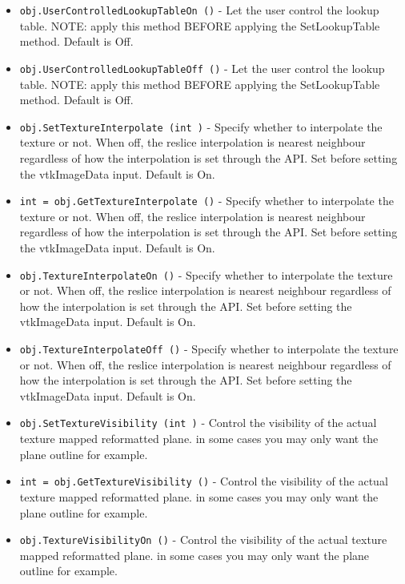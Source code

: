 \begin{itemize}
\item  \verb|obj.UserControlledLookupTableOn ()| -  Let the user control the lookup table. NOTE: apply this method BEFORE
 applying the SetLookupTable method.
 Default is Off.

\item  \verb|obj.UserControlledLookupTableOff ()| -  Let the user control the lookup table. NOTE: apply this method BEFORE
 applying the SetLookupTable method.
 Default is Off.

\item  \verb|obj.SetTextureInterpolate (int )| -  Specify whether to interpolate the texture or not. When off, the
 reslice interpolation is nearest neighbour regardless of how the
 interpolation is set through the API. Set before setting the
 vtkImageData input. Default is On.

\item  \verb|int = obj.GetTextureInterpolate ()| -  Specify whether to interpolate the texture or not. When off, the
 reslice interpolation is nearest neighbour regardless of how the
 interpolation is set through the API. Set before setting the
 vtkImageData input. Default is On.

\item  \verb|obj.TextureInterpolateOn ()| -  Specify whether to interpolate the texture or not. When off, the
 reslice interpolation is nearest neighbour regardless of how the
 interpolation is set through the API. Set before setting the
 vtkImageData input. Default is On.

\item  \verb|obj.TextureInterpolateOff ()| -  Specify whether to interpolate the texture or not. When off, the
 reslice interpolation is nearest neighbour regardless of how the
 interpolation is set through the API. Set before setting the
 vtkImageData input. Default is On.

\item  \verb|obj.SetTextureVisibility (int )| -  Control the visibility of the actual texture mapped reformatted plane.
 in some cases you may only want the plane outline for example.

\item  \verb|int = obj.GetTextureVisibility ()| -  Control the visibility of the actual texture mapped reformatted plane.
 in some cases you may only want the plane outline for example.

\item  \verb|obj.TextureVisibilityOn ()| -  Control the visibility of the actual texture mapped reformatted plane.
 in some cases you may only want the plane outline for example.


\end{itemize}
